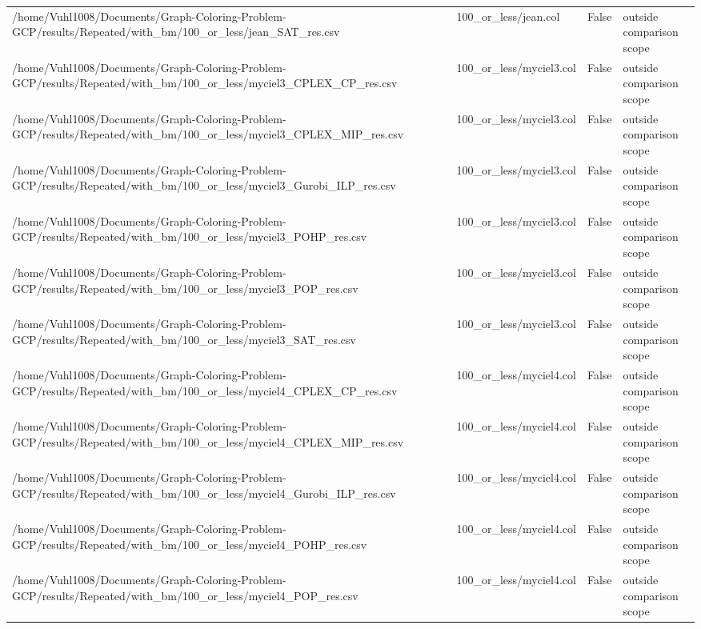 \begin{table}[htbp]
\begin{tabular}{llll}
/home/Vuhl1008/Documents/Graph-Coloring-Problem-GCP/results/Repeated/with\_bm/100\_or\_less/jean\_SAT\_res.csv & 100\_or\_less/jean.col & False & outside comparison scope \\
/home/Vuhl1008/Documents/Graph-Coloring-Problem-GCP/results/Repeated/with\_bm/100\_or\_less/myciel3\_CPLEX\_CP\_res.csv & 100\_or\_less/myciel3.col & False & outside comparison scope \\
/home/Vuhl1008/Documents/Graph-Coloring-Problem-GCP/results/Repeated/with\_bm/100\_or\_less/myciel3\_CPLEX\_MIP\_res.csv & 100\_or\_less/myciel3.col & False & outside comparison scope \\
/home/Vuhl1008/Documents/Graph-Coloring-Problem-GCP/results/Repeated/with\_bm/100\_or\_less/myciel3\_Gurobi\_ILP\_res.csv & 100\_or\_less/myciel3.col & False & outside comparison scope \\
/home/Vuhl1008/Documents/Graph-Coloring-Problem-GCP/results/Repeated/with\_bm/100\_or\_less/myciel3\_POHP\_res.csv & 100\_or\_less/myciel3.col & False & outside comparison scope \\
/home/Vuhl1008/Documents/Graph-Coloring-Problem-GCP/results/Repeated/with\_bm/100\_or\_less/myciel3\_POP\_res.csv & 100\_or\_less/myciel3.col & False & outside comparison scope \\
/home/Vuhl1008/Documents/Graph-Coloring-Problem-GCP/results/Repeated/with\_bm/100\_or\_less/myciel3\_SAT\_res.csv & 100\_or\_less/myciel3.col & False & outside comparison scope \\
/home/Vuhl1008/Documents/Graph-Coloring-Problem-GCP/results/Repeated/with\_bm/100\_or\_less/myciel4\_CPLEX\_CP\_res.csv & 100\_or\_less/myciel4.col & False & outside comparison scope \\
/home/Vuhl1008/Documents/Graph-Coloring-Problem-GCP/results/Repeated/with\_bm/100\_or\_less/myciel4\_CPLEX\_MIP\_res.csv & 100\_or\_less/myciel4.col & False & outside comparison scope \\
/home/Vuhl1008/Documents/Graph-Coloring-Problem-GCP/results/Repeated/with\_bm/100\_or\_less/myciel4\_Gurobi\_ILP\_res.csv & 100\_or\_less/myciel4.col & False & outside comparison scope \\
/home/Vuhl1008/Documents/Graph-Coloring-Problem-GCP/results/Repeated/with\_bm/100\_or\_less/myciel4\_POHP\_res.csv & 100\_or\_less/myciel4.col & False & outside comparison scope \\
/home/Vuhl1008/Documents/Graph-Coloring-Problem-GCP/results/Repeated/with\_bm/100\_or\_less/myciel4\_POP\_res.csv & 100\_or\_less/myciel4.col & False & outside comparison scope \\

\end{tabular}
\end{table}
